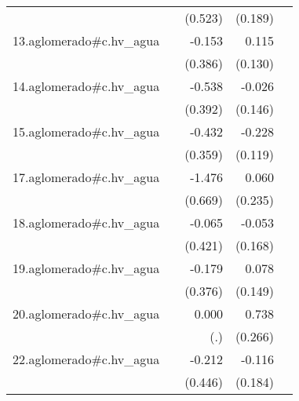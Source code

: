 {\begin{longtable}{l*{4}{D{.}{.}{-1}}}
            &                     &     (0.523)         &     (0.189)         &                     \\
\addlinespace
13.aglomerado#c.hv\_agua&                     &      -0.153         &       0.115         &                     \\
            &                     &     (0.386)         &     (0.130)         &                     \\
\addlinespace
14.aglomerado#c.hv\_agua&                     &      -0.538         &      -0.026         &                     \\
            &                     &     (0.392)         &     (0.146)         &                     \\
\addlinespace
15.aglomerado#c.hv\_agua&                     &      -0.432         &      -0.228         &                     \\
            &                     &     (0.359)         &     (0.119)         &                     \\
\addlinespace
17.aglomerado#c.hv\_agua&                     &      -1.476\sym{*}  &       0.060         &                     \\
            &                     &     (0.669)         &     (0.235)         &                     \\
\addlinespace
18.aglomerado#c.hv\_agua&                     &      -0.065         &      -0.053         &                     \\
            &                     &     (0.421)         &     (0.168)         &                     \\
\addlinespace
19.aglomerado#c.hv\_agua&                     &      -0.179         &       0.078         &                     \\
            &                     &     (0.376)         &     (0.149)         &                     \\
\addlinespace
20.aglomerado#c.hv\_agua&                     &       0.000         &       0.738\sym{**} &                     \\
            &                     &         (.)         &     (0.266)         &                     \\
\addlinespace
22.aglomerado#c.hv\_agua&                     &      -0.212         &      -0.116         &                     \\
            &                     &     (0.446)         &     (0.184)         &                     \\

\end{longtable}}
